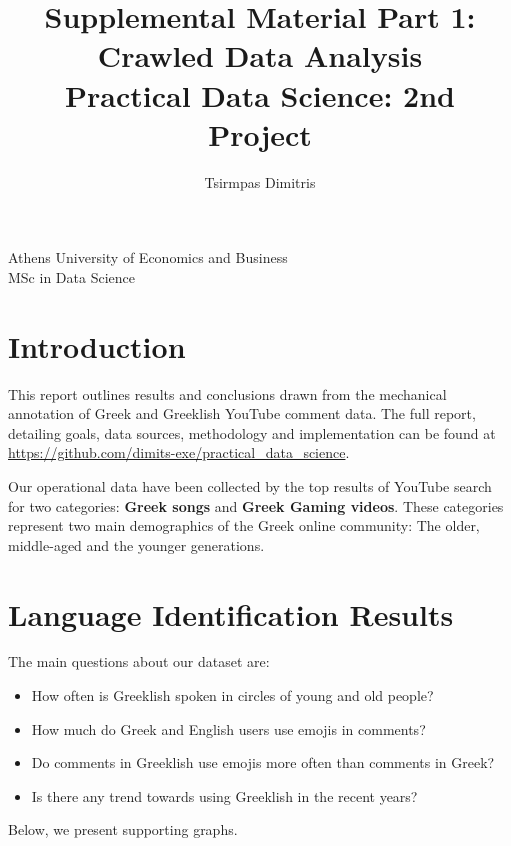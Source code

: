 \documentclass[11pt, a4paper]{article}
\title{\Huge Supplemental Material Part 1: Crawled Data Analysis\\
	\LARGE Practical Data Science: 2nd Project}
\author{\Large  Tsirmpas Dimitris }
\begin{document}
	
	\maketitle
	\begin{center}
		\large Athens University of Economics and Business \\
		\large MSc in Data Science
		
	\end{center}
	
	
	\section{Introduction}
	This report outlines results and conclusions drawn from the mechanical annotation of Greek and Greeklish YouTube comment data. The full report, detailing goals, data sources, methodology and implementation can be found at \url{https://github.com/dimits-exe/practical_data_science}.
	
	Our operational data have been collected by the top results of YouTube search for two categories: \textbf{Greek songs} and \textbf{Greek Gaming videos}. These categories represent two main demographics of the Greek online community: The older, middle-aged and the younger generations.
	
	
	\section{Language Identification Results}
	
	The main questions about our dataset are:
	\begin{itemize}
		\item How often is Greeklish spoken in circles of young and old people?
		\item How much do Greek and English users use emojis in comments?
		\item Do comments in Greeklish use emojis more often than comments in Greek?
		\item Is there any trend towards using Greeklish in the recent years?
	\end{itemize}
	
	Below, we present supporting graphs.
	
	
	
\end{document}
